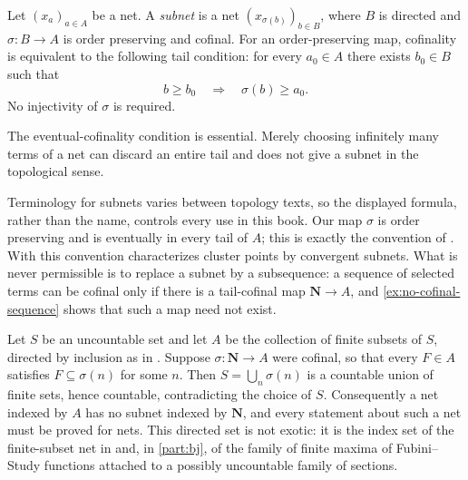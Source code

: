 \begin{definition}
\label{def:subnet}
Let $(x_a)_{a\in A}$ be a net.  A \emph{subnet} is a net
$(x_{\sigma(b)})_{b\in B}$, where $B$ is directed and
$\sigma:B\to A$ is order preserving and cofinal.  For an order-preserving
map, cofinality is equivalent to the following tail condition: for every
$a_0\in A$ there exists $b_0\in B$ such that
\[
                   b\geq b_0\quad\Longrightarrow\quad
                   \sigma(b)\geq a_0.
\]
No injectivity of $\sigma$ is required.
\end{definition}

The eventual-cofinality condition is essential.  Merely choosing infinitely
many terms of a net can discard an entire tail and does not give a subnet in
the topological sense.

\begin{remark}
\label{rem:subnet-conventions}
Terminology for subnets varies between topology texts, so the displayed
formula, rather than the name, controls every use in this book.  Our map
$\sigma$ is order preserving and is eventually in every tail of $A$; this is
exactly the convention of .
With this convention  characterizes cluster
points by convergent subnets.  What is never permissible is to replace a
subnet by a subsequence: a sequence of selected terms can be cofinal only if
there is a tail-cofinal map $\mathbf N\to A$, and
\cref{ex:no-cofinal-sequence} shows that such a map need not exist.
\end{remark}

\begin{example}
\label{ex:no-cofinal-sequence}
Let $S$ be an uncountable set and let $A$ be the collection of finite subsets
of $S$, directed by inclusion as in
.  Suppose $\sigma:\mathbf N\to A$ were
cofinal, so that every $F\in A$ satisfies $F\subseteq\sigma(n)$ for some $n$.
Then $S=\bigcup_{n}\sigma(n)$ is a countable union of finite sets, hence
countable, contradicting the choice of $S$.  Consequently a net indexed by
$A$ has no subnet indexed by $\mathbf N$, and every statement about such a net
must be proved for nets.  This directed set is not exotic: it is the index set
of the finite-subset net in  and, in
\cref{part:bj}, of the family of finite maxima of Fubini--Study functions
attached to a possibly uncountable family of sections.
\end{example}

